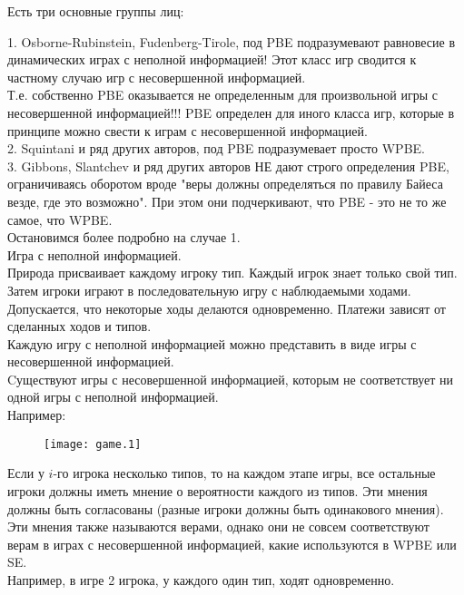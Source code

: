 \documentclass[pdftex,12pt,a4paper]{article}
\begin{document}
Есть три основные группы лиц:

1. Osborne-Rubinstein, Fudenberg-Tirole, под PBE подразумевают
равновесие в динамических играх с неполной информацией! Этот класс
игр сводится к частному случаю игр с несовершенной информацией. \\

Т.е. собственно PBE оказывается не определенным для произвольной
игры с несовершенной информацией!!! PBE определен для иного класса
игр, которые в принципе можно свести к играм с несовершенной
информацией. \\

2. Squintani и ряд других авторов, под PBE подразумевает просто WPBE. \\

3. Gibbons, Slantchev и ряд других авторов НЕ дают строго
определения PBE, ограничиваясь оборотом вроде "веры должны
определяться по правилу Байеса везде, где это возможно". При этом
они подчеркивают, что PBE - это не то же самое, что WPBE. \\

Остановимся более подробно на случае 1. \\

Игра с неполной информацией. \\
Природа присваивает каждому игроку тип. Каждый игрок знает только
свой тип. Затем игроки играют в последовательную игру с
наблюдаемыми ходами. Допускается, что некоторые ходы делаются
одновременно. Платежи зависят от сделанных ходов и типов. \\
Каждую игру с неполной информацией можно представить в виде игры с
несовершенной информацией. \\
Cуществуют игры с несовершенной информацией, которым не
соответствует ни одной игры с неполной информацией. \\
Например: \\
\begin{figure}[h]
  \texttt{[image: game.1]}
\end{figure}


Если у $i$-го игрока несколько типов, то на каждом этапе игры, все
остальные игроки должны иметь мнение о вероятности каждого из
типов. Эти мнения должны быть согласованы (разные игроки должны
быть одинакового мнения). \\
Эти мнения также называются верами, однако они не совсем
соответствуют верам в играх с несовершенной информацией, какие
используются в WPBE или SE. \\
Например, в игре 2 игрока, у каждого один тип, ходят одновременно. \\
\end{document}
